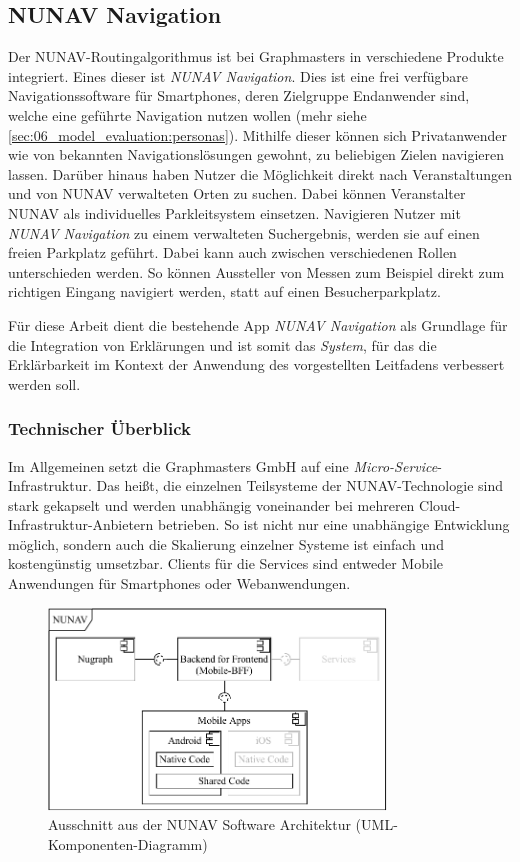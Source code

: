 \subsection{NUNAV Navigation}

Der NUNAV-Routingalgorithmus ist bei Graphmasters in verschiedene Produkte integriert. Eines dieser ist \textit{NUNAV Navigation}. Dies ist eine frei verfügbare Navigationssoftware für Smartphones, deren Zielgruppe Endanwender sind, welche eine geführte Navigation nutzen wollen (mehr siehe \autoref{sec:06_model_evaluation:personas}). Mithilfe dieser können sich Privatanwender wie von bekannten Navigationslösungen gewohnt, zu beliebigen Zielen navigieren lassen. Darüber hinaus haben Nutzer die Möglichkeit direkt nach Veranstaltungen und von NUNAV verwalteten Orten zu suchen. Dabei können Veranstalter NUNAV als individuelles Parkleitsystem einsetzen. Navigieren Nutzer mit \textit{NUNAV Navigation} zu einem verwalteten Suchergebnis, werden sie auf einen freien Parkplatz geführt. Dabei kann auch zwischen verschiedenen Rollen unterschieden werden. So können Aussteller von Messen zum Beispiel direkt zum richtigen Eingang navigiert werden, statt auf einen Besucherparkplatz.

Für diese Arbeit dient die bestehende App \textit{NUNAV Navigation} als Grundlage für die Integration von Erklärungen und ist somit das \textit{System}, für das die Erklärbarkeit im Kontext der Anwendung des vorgestellten Leitfadens verbessert werden soll.

\subsubsection{Technischer Überblick}

Im Allgemeinen setzt die Graphmasters GmbH auf eine \textit{Micro-Service}-Infrastruktur. Das heißt, die einzelnen Teilsysteme der NUNAV-Technologie sind stark gekapselt und werden unabhängig voneinander bei mehreren Cloud-Infrastruktur-Anbietern betrieben. So ist nicht nur eine unabhängige Entwicklung möglich, sondern auch die Skalierung einzelner Systeme ist einfach und kostengünstig umsetzbar. Clients für die Services sind entweder Mobile Anwendungen für Smartphones oder Webanwendungen.

\begin{figure}[htb!]
    \centering
    \includegraphics[width=0.8\textwidth]{contents/06_model_evaluation/01_integration/res/nunav_architecture.pdf}
    \caption{Ausschnitt aus der NUNAV Software Architektur (UML-Komponenten-Diagramm)}
    \label{fig:nunav_software_architecture}
\end{figure}

